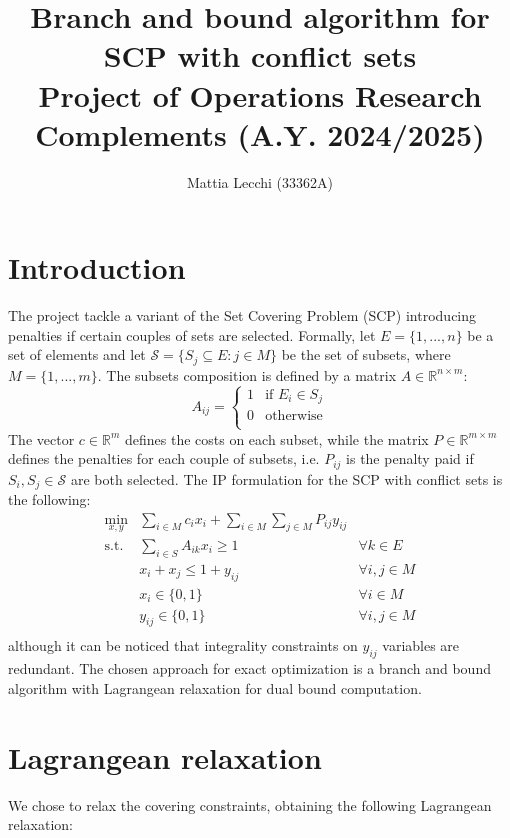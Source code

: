 \documentclass[a4paper]{article}
\author{Mattia Lecchi (33362A)}
\title{Branch and bound algorithm for SCP with conflict sets\\ 
	\large Project of Operations Research Complements (A.Y. 2024/2025)}
\begin{document}
	\maketitle
	
\section{Introduction}

The project tackle a variant of the Set Covering Problem (SCP) introducing penalties if certain couples of sets are selected. Formally, let $E=\{1,...,n\}$ be a set of elements and let $\mathcal S=\{S_j\subseteq E : j \in M\}$ be the set of subsets, where $M=\{1,...,m\}$. 
The subsets composition is defined by a matrix $A \in \mathbb R^{n\times m}$:
$$
A_{ij} =
\begin{cases}
	1& \text{if } E_i \in S_j\\
	0& \text{otherwise}\\
\end{cases}
$$
The vector $c \in \mathbb R^{m}$ defines the costs on each subset, while the matrix $P \in \mathbb R^{m\times m}$ defines the penalties for each couple of subsets, i.e. $P_{ij}$ is the penalty paid if $S_i,S_j\in \mathcal S$ are both selected.
The IP formulation for the SCP with conflict sets is the following:
\begin{align*}
	\min_{x,y} & \sum_{i\in M} c_i x_i + \sum_{i \in M} \sum_{j \in M} P_{ij} y_{ij} & \\
	\text{s.t. } 
	& \sum_{i\in S} A_{ik} x_i \ge 1 & \forall k \in E \\
	& x_i + x_j \le 1 + y_{ij} & \forall i,j \in M \\
	& x_i \in \{0, 1\} & \forall i \in M \\
	& y_{ij} \in \{0, 1\} & \forall i,j \in M\\
\end{align*}
although it can be noticed that integrality constraints on $y_{ij}$ variables are redundant.
The chosen approach for exact optimization is a branch and bound algorithm with Lagrangean relaxation for dual bound computation.

\section{Lagrangean relaxation}

We chose to relax the covering constraints, obtaining the following Lagrangean relaxation:
\end{document}
